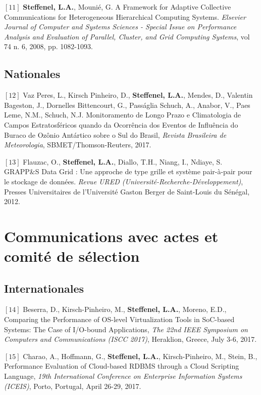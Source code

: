 \documentclass[final,twoside]{hdr} %
\begin{document}
\vspace{1em} \noindent $[11]$
{\bf Steffenel, L.A.}, Mounié, G. {A Framework for Adaptive Collective Communications for Heterogeneous Hierarchical Computing Systems}. {\em Elsevier Journal of Computer and Systems Sciences - Special Issue on Performance Analysis and Evaluation of Parallel, Cluster, and Grid Computing Systems}, vol 74 n. 6, 2008, pp. 1082-1093.


\subsection*{Nationales}

 \noindent $[12]$
Vaz Peres, L., Kirsch Pinheiro, D., {\bf Steffenel, L.A.}, Mendes, D., Valentin Bageston, J., Dornelles Bittencourt, G., Passáglia Schuch, A., Anabor, V., Paes Leme, N.M., Schuch, N.J. {Monitoramento de Longo Prazo e Climatologia de Campos Estratosféricos quando da Ocorrência dos Eventos de Influência do Buraco de Ozônio Antártico sobre o Sul do Brasil}, {\em Revista Brasileira de Meteorologia}, SBMET/Thomson-Reuters, 2017.

\vspace{1em} \noindent $[13]$
Flauzac, O., {\bf Steffenel, L.A.}, Diallo, T.H., Niang, I., Ndiaye, S. {GRAPP\&S Data Grid : Une approche de type grille et système pair-à-pair pour le stockage de données}. {\em Revue URED (Université-Recherche-Développement)}, Presses Universitaires de l'Université Gaston Berger de Saint-Louis du Sénégal, 2012.

\section*{Communications avec actes et comité de sélection}

\subsection*{Internationales}

\noindent $[14]$
Beserra, D., Kirsch-Pinheiro, M., {\bf Steffenel, L.A.},  Moreno, E.D., {Comparing the Performance of OS-level Virtualization Tools in SoC-based Systems: The Case of I/O-bound Applications}, {\em The 22nd IEEE Symposium on Computers and Communications (ISCC 2017)}, Heraklion, Greece, July 3-6, 2017.

\vspace{1em} \noindent $[15]$
Charao, A., Hoffmann, G., {\bf Steffenel, L.A.}, Kirsch-Pinheiro, M., Stein, B., {Performance Evaluation of Cloud-based RDBMS through a Cloud Scripting Language}, {\em 19th International Conference on Enterprise Information Systems (ICEIS)}, Porto, Portugal, April 26-29, 2017.
\end{document}
